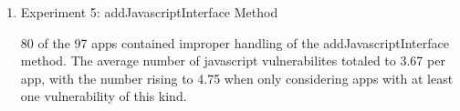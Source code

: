 \begin{enumerate}
    \item Experiment 5: addJavascriptInterface Method
    
    80 of the 97 apps contained improper handling of the addJavascriptInterface
    method. The average number of javascript vulnerabilites totaled to 
    3.67 per app, with the number rising to 4.75 when only considering
    apps with at least one vulnerability of this kind.


\end{enumerate}





